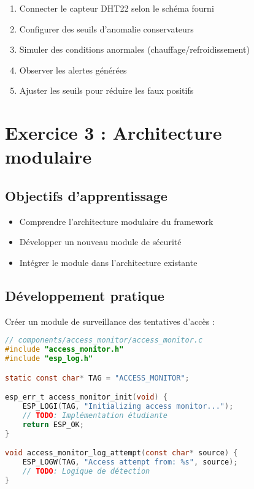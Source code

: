 \begin{enumerate}
    \item Connecter le capteur DHT22 selon le schéma fourni
    \item Configurer des seuils d'anomalie conservateurs
    \item Simuler des conditions anormales (chauffage/refroidissement)
    \item Observer les alertes générées
    \item Ajuster les seuils pour réduire les faux positifs
\end{enumerate}

\section{Exercice 3 : Architecture modulaire}

\subsection{Objectifs d'apprentissage}

\begin{itemize}
    \item Comprendre l'architecture modulaire du framework
    \item Développer un nouveau module de sécurité
    \item Intégrer le module dans l'architecture existante
\end{itemize}

\subsection{Développement pratique}

Créer un module de surveillance des tentatives d'accès :

\begin{lstlisting}[language=C, caption=Template nouveau module]
// components/access_monitor/access_monitor.c
#include "access_monitor.h"
#include "esp_log.h"

static const char* TAG = "ACCESS_MONITOR";

esp_err_t access_monitor_init(void) {
    ESP_LOGI(TAG, "Initializing access monitor...");
    // TODO: Implémentation étudiante
    return ESP_OK;
}

void access_monitor_log_attempt(const char* source) {
    ESP_LOGW(TAG, "Access attempt from: %s", source);
    // TODO: Logique de détection
}
\end{lstlisting}

